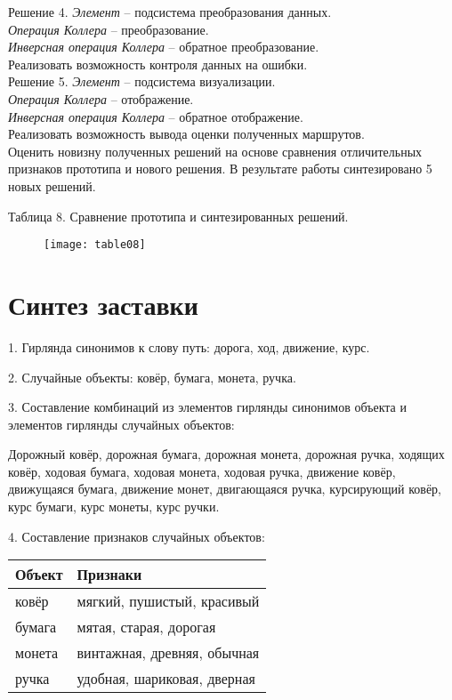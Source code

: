 Решение 4.
\emph{Элемент} -- подсистема преобразования данных.\\
\emph{Операция Коллера} -- преобразование.\\
\emph{Инверсная операция Коллера} -- обратное преобразование.\\
Реализовать возможность контроля данных на ошибки.\\

Решение 5.
\emph{Элемент} -- подсистема визуализации.\\
\emph{Операция Коллера} -- отображение.\\
\emph{Инверсная операция Коллера} -- обратное отображение.\\
Реализовать возможность вывода оценки полученных маршрутов.\\

Оценить новизну полученных решений на основе сравнения отличительных признаков прототипа и нового решения. 
В результате работы синтезировано 5 новых решений.

\pagebreak

Таблица 8. Сравнение прототипа и синтезированных решений. 
\begin{figure}[h!]
    \center
    \texttt{[image: table08]}
\end{figure}

\chapter{Синтез заставки}
1. Гирлянда синонимов к слову путь: дорога, ход, движение, курс.

2. Случайные объекты: ковёр, бумага, монета, ручка.

3. Составление комбинаций из элементов гирлянды синонимов объекта и элементов гирлянды случайных объектов:

Дорожный ковёр, дорожная бумага, дорожная монета, дорожная ручка, ходящих ковёр, ходовая бумага, 
ходовая монета, ходовая ручка, движение ковёр, движущаяся бумага, движение монет, двигающаяся ручка, 
курсирующий ковёр, курс бумаги, курс монеты, курс ручки.

4. Составление признаков случайных объектов:
\begin{table}[h!]
    \center
    \begin{tabularx}{\textwidth}{|X|X|}
        \hline
        Объект & Признаки \\ \hline
        ковёр & мягкий, пушистый, красивый \\ \hline
        бумага & мятая, старая, дорогая \\ \hline
        монета & винтажная, древняя, обычная \\ \hline
        ручка & удобная, шариковая, дверная \\ \hline
    \end{tabularx}
\end{table}

